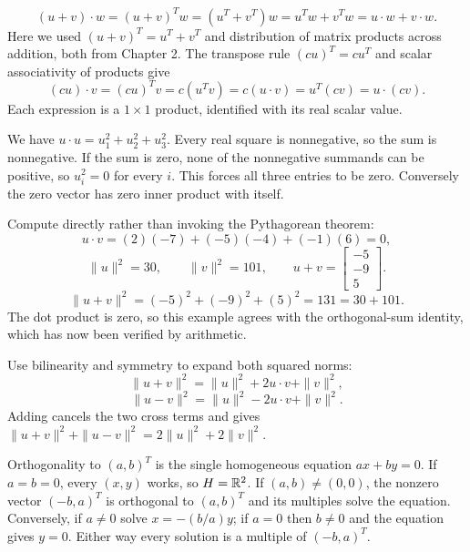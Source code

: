 \[
(u+v)\cdot w=(u+v)^Tw=(u^T+v^T)w=u^Tw+v^Tw
=u\cdot w+v\cdot w.
\]
Here we used $(u+v)^T=u^T+v^T$ and distribution of matrix products
across addition, both from Chapter 2.
The transpose rule $(cu)^T=cu^T$ and scalar associativity of products give
\[
(cu)\cdot v=(cu)^Tv=c(u^Tv)=c(u\cdot v)
=u^T(cv)=u\cdot(cv).
\]
Each expression is a $1\times1$ product, identified with its real scalar value.

We have $u\cdot u=u_1^2+u_2^2+u_3^2$. Every real square is
nonnegative, so the sum is nonnegative. If the sum is zero, none of the
nonnegative summands can be positive, so $u_i^2=0$ for every $i$.
This forces all three entries to be zero. Conversely the zero vector has
zero inner product with itself.

Compute directly rather than invoking the Pythagorean theorem:
\[u\cdot v=(2)(-7)+(-5)(-4)+(-1)(6)=0,\]
\[\|u\|^2=30,\qquad\|v\|^2=101,\qquad u+v=\left[\begin{array}{r}-5\\-9\\5\end{array}\right].\]
\[\|u+v\|^2=(-5)^2+(-9)^2+(5)^2=131=30+101.\]
The dot product is zero, so this example agrees with the orthogonal-sum identity, which has now been verified by arithmetic.

Use bilinearity and symmetry to expand both squared norms:
\[
\|u+v\|^2=\|u\|^2+2u\cdot v+\|v\|^2,
\]
\[
\|u-v\|^2=\|u\|^2-2u\cdot v+\|v\|^2.
\]
Adding cancels the two cross terms and gives
$\|u+v\|^2+\|u-v\|^2=2\|u\|^2+2\|v\|^2$.

Orthogonality to $(a,b)^T$ is the single homogeneous equation
$ax+by=0$. If $a=b=0$, every $(x,y)$ works, so $H=\mathbb{R}^2$.
If $(a,b)\ne(0,0)$, the nonzero vector $(-b,a)^T$ is orthogonal
to $(a,b)^T$ and its multiples solve the equation. Conversely, if
$a\ne0$ solve $x=-(b/a)y$; if $a=0$ then $b\ne0$ and the
equation gives $y=0$. Either way every solution is a multiple of
$(-b,a)^T$.

